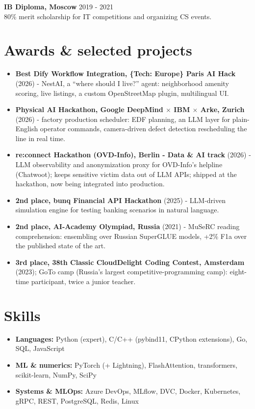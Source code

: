 \documentclass[10pt]{article}
\newcommand{\entry}[3]{%
  \textbf{#1} \hfill {\small\color{gray!90!black}#2}\\
  #3\par\vspace{4pt}}
\begin{document}
\entry{IB Diploma, Moscow}{2019 - 2021}
{80\% merit scholarship for IT competitions and organizing CS events.}

\section{Awards \& selected projects}

\begin{itemize}
  \item \textbf{Best Dify Workflow Integration, \{Tech: Europe\} Paris AI Hack} (2026) -
    NestAI, a ``where should I live?'' agent: neighborhood amenity scoring, live
    listings, a custom OpenStreetMap plugin, multilingual UI.
  \item \textbf{Physical AI Hackathon, Google DeepMind $\times$ IBM $\times$ Arke, Zurich} (2026) -
    factory production scheduler: EDF planning, an LLM layer for plain-English operator
    commands, camera-driven defect detection rescheduling the line in real time.
  \item \textbf{re:connect Hackathon (OVD-Info), Berlin - Data \& AI track} (2026) -
    LLM observability and anonymization proxy for OVD-Info's helpline (Chatwoot);
    keeps sensitive victim data out of LLM APIs; shipped at the hackathon, now being
    integrated into production.
  \item \textbf{2nd place, bunq Financial API Hackathon} (2025) - LLM-driven simulation
    engine for testing banking scenarios in natural language.
  \item \textbf{2nd place, AI-Academy Olympiad, Russia} (2021) - MuSeRC reading
    comprehension: ensembling over Russian SuperGLUE models, +2\% F1a over the published
    state of the art.
  \item \textbf{3rd place, 38th Classic CloudDelight Coding Contest, Amsterdam} (2023);
    GoTo camp (Russia's largest competitive-programming camp): eight-time participant,
    twice a junior teacher.
\end{itemize}

\section{Skills}

\begin{itemize}
  \item \textbf{Languages:} Python (expert), C/C++ (pybind11, CPython extensions), Go,
    SQL, JavaScript
  \item \textbf{ML \& numerics:} PyTorch (+ Lightning), FlashAttention, transformers,
    scikit-learn, NumPy, SciPy
  \item \textbf{Systems \& MLOps:} Azure DevOps, MLflow, DVC, Docker, Kubernetes, gRPC,
    REST, PostgreSQL, Redis, Linux
\end{itemize}
\end{document}
